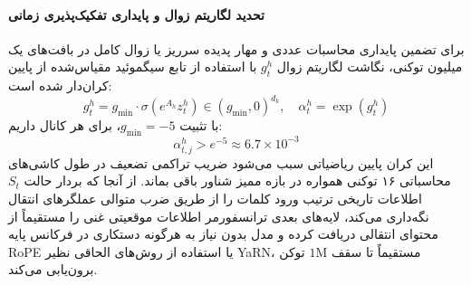 \paragraph*{تحدید لگاریتم زوال و پایداری تفکیک‌پذیری زمانی}
برای تضمین پایداری محاسبات عددی و مهار پدیده سرریز یا زوال کامل در بافت‌های یک میلیون توکنی، نگاشت لگاریتم زوال $g_t^h$ با استفاده از تابع سیگموئید مقیاس‌شده از پایین کران‌دار شده است:
\begin{equation}
    g_t^h = g_{\min} \cdot \sigma\left( e^{A_h} z_t^h \right) \in (g_{\min}, 0)^{d_k}, \quad \alpha_t^h = \exp(g_t^h)
\end{equation}
با تثبیت $g_{\min} = -5$، برای هر کانال داریم:
\begin{equation}
    \alpha_{t, j}^h > e^{-5} \approx 6.7 \times 10^{-3}
\end{equation}
این کران پایین ریاضیاتی سبب می‌شود ضریب تراکمی تضعیف در طول کاشی‌های محاسباتی ۱۶ توکنی همواره در بازه ممیز شناور  باقی بماند. از آنجا که بردار حالت $S_t$ اطلاعات تاریخی ترتیب ورود کلمات را از طریق ضرب متوالی عملگرهای انتقال نگه‌داری می‌کند، لایه‌های بعدی ترانسفورمر اطلاعات موقعیتی غنی را مستقیماً از محتوای انتقالی دریافت کرده و مدل بدون نیاز به هرگونه دستکاری در فرکانس پایه RoPE یا استفاده از روش‌های الحاقی نظیر YaRN، مستقیماً تا سقف $1\text{M}$ توکن برون‌یابی می‌کند.

